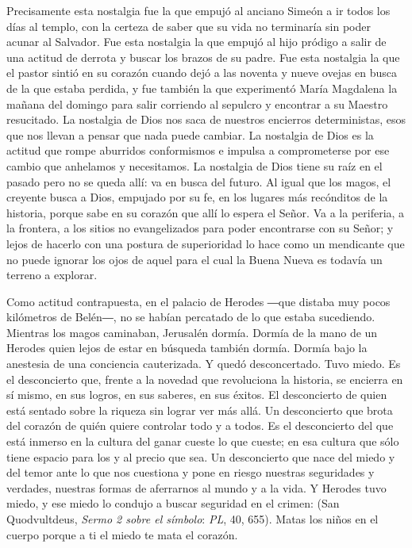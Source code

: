 Precisamente esta nostalgia fue la que empujó al anciano Simeón a ir todos los días al templo, con la certeza de saber que su vida no terminaría sin poder acunar al Salvador. Fue esta nostalgia la que empujó al hijo pródigo a salir de una actitud de derrota y buscar los brazos de su padre. Fue esta nostalgia la que el pastor sintió en su corazón cuando dejó a las noventa y nueve ovejas en busca de la que estaba perdida, y fue también la que experimentó María Magdalena la mañana del domingo para salir corriendo al sepulcro y encontrar a su Maestro resucitado. La nostalgia de Dios nos saca de nuestros encierros deterministas, esos que nos llevan a pensar que nada puede cambiar. La nostalgia de Dios es la actitud que rompe aburridos conformismos e impulsa a comprometerse por ese cambio que anhelamos y necesitamos. La nostalgia de Dios tiene su raíz en el pasado pero no se queda allí: va en busca del futuro. Al igual que los magos, el creyente  busca a Dios, empujado por su fe, en los lugares más recónditos de la historia, porque sabe en su corazón que allí lo espera el Señor. Va a la periferia, a la frontera, a los sitios no evangelizados para poder encontrarse con su Señor; y lejos de hacerlo con una postura de superioridad lo hace como un mendicante que no puede ignorar los ojos de aquel para el cual la Buena Nueva es todavía un terreno a explorar.

Como actitud contrapuesta, en el palacio de Herodes ―que distaba muy pocos kilómetros de Belén―, no se habían percatado de lo que estaba sucediendo. Mientras los magos caminaban, Jerusalén dormía. Dormía de la mano de un Herodes quien lejos de estar en búsqueda también dormía. Dormía bajo la anestesia de una conciencia cauterizada. Y quedó desconcertado. Tuvo miedo. Es el desconcierto que, frente a la novedad que revoluciona la historia, se encierra en sí mismo, en sus logros, en sus saberes, en sus éxitos. El desconcierto de quien está sentado sobre la riqueza sin lograr ver más allá. Un desconcierto que brota del corazón de quién quiere controlar todo y a todos. Es el desconcierto del que está inmerso en la cultura del ganar cueste lo que cueste; en esa cultura que sólo tiene espacio para los  y al precio que sea. Un desconcierto que nace del miedo y del temor ante lo que nos cuestiona y pone en riesgo nuestras seguridades y verdades, nuestras formas de aferrarnos al mundo y a la vida. Y Herodes tuvo miedo, y ese miedo lo condujo a buscar seguridad en el crimen:  (San Quodvultdeus, \emph{Sermo 2 sobre el símbolo}: \emph{PL}, 40, 655). Matas los niños en el cuerpo porque a ti el miedo te mata el corazón.

